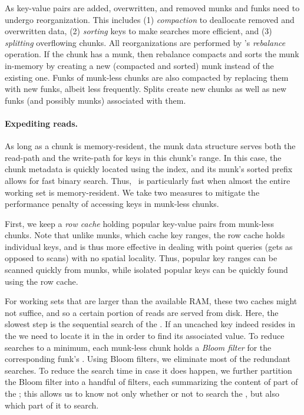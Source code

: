 As key-value pairs are added, overwritten, and removed munks and funks need to undergo reorganization. This includes  
(1) \emph{compaction} to deallocate removed and overwritten data, 
(2) \emph{sorting} keys to make searches more efficient,  and
(3) \emph{splitting} overflowing chunks.
All reorganizations are performed by \sys's \emph{rebalance} operation.
If the chunk has a munk, then rebalance compacts and sorts the munk in-memory by creating a new 
(compacted and sorted) munk instead of the existing one. 
Funks of munk-less chunks are also compacted by replacing them with new funks, albeit less frequently.
Splits  create new chunks as well as new  funks (and possibly munks) associated with them.

\paragraph{Expediting reads.}
As long as a chunk  is memory-resident, the munk data structure serves both the read-path and the write-path for keys in this chunk's range. 
In this case, the chunk metadata is quickly located using the index, and its munk's sorted prefix allows for fast binary search.
Thus, \sys\ is particularly fast when almost the entire working set is memory-resident. 
We take two measures to mitigate the performance penalty of accessing keys in munk-less chunks.

First, we keep a \emph{row cache} holding popular key-value pairs from munk-less chunks. Note that unlike munks, which cache key ranges, the row
cache holds individual keys, and is thus more effective in dealing with point queries (gets as opposed to scans) with no
spatial locality.
Thus, popular key ranges %
can be scanned quickly from munks, 
while  isolated popular keys %
can be quickly found using the row cache.

For working sets that are  larger than the available RAM, these two caches might not suffice, and so a certain portion of reads are served from disk. Here, the slowest step is the sequential search of the . 
If an uncached key indeed resides in the 
 we need to locate it in the  in order to find 
its associated value. To reduce  searches to a minimum,
each munk-less chunk holds a \emph{Bloom filter} for the corresponding funk's .
Using Bloom filters, we eliminate most of the redundant   searches.
To reduce the  search time in case it does happen, 
we further  partition the Bloom filter into a  handful of filters, each summarizing the 
content of part of the ; this allows us to know not only whether or not to search the 
, but also which part of it to search.  
 




